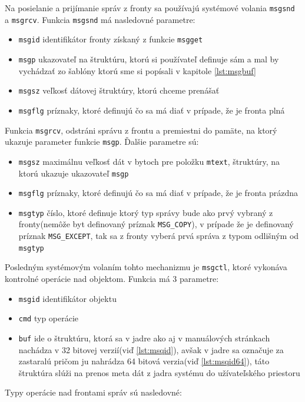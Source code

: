 Na posielanie a prijímanie správ z fronty sa používajú systémové volania \texttt{msgsnd} a \texttt{msgrcv}. Funkcia \texttt{msgsnd} má nasledovné parametre\cite{msgop}:
\begin{itemize}
\item \texttt{msgid} identifikátor fronty získaný z funkcie \texttt{msgget}
\item \texttt{msgp} ukazovateľ na štruktúru, ktorú si používateľ definuje sám a mal by vychádzať zo šablóny ktorú sme si popísali v kapitole \ref{lst:msgbuf}
\item \texttt{msgsz} veľkosť dátovej štruktúry, ktorú chceme prenášať
\item \texttt{msgflg} príznaky, ktoré definujú čo sa má diať v prípade, že je fronta plná
\end{itemize}
Funkcia \texttt{msgrcv}, odstráni správu z frontu a premiestni do pamäte, na ktorý ukazuje parameter funkcie \texttt{msgp}. Ďalšie parametre sú\cite{msgop}:
\begin{itemize}
\item \texttt{msgsz} maximálnu veľkosť dát v bytoch pre položku \texttt{mtext}, štruktúry, na ktorú ukazuje ukazovateľ \texttt{msgp}
\item \texttt{msgflg} príznaky, ktoré definujú čo sa má diať v prípade, že je fronta prázdna
\item \texttt{msgtyp} číslo, ktoré definuje ktorý typ správy bude ako prvý vybraný z fronty(nemôže byt definovaný príznak \texttt{MSG\_COPY}), v prípade že je definovaný príznak \texttt{MSG\_EXCEPT}, tak sa z fronty vyberá prvá správa z typom odlišným od \texttt{msgtyp}
\end{itemize}
Posledným systémovým volaním tohto mechanizmu je \texttt{msgctl}, ktoré vykonáva kontrolné operácie nad objektom. Funkcia má 3 parametre\cite{msgctl}:
\begin{itemize}
\item \texttt{msgid} identifikátor objektu
\item \texttt{cmd} typ operácie
\item \texttt{buf} ide o štruktúru, ktorá sa v jadre ako aj v manuálových stránkach nachádza v 32 bitovej verzií(viď \ref{lst:msqid}), avšak v jadre sa označuje za zastaralú pričom ju nahrádza 64 bitová verzia(viď \ref{lst:msqid64}), táto štruktúra slúži na prenos meta dát z jadra systému do užívateľského priestoru
\end{itemize}
Typy operácie nad frontami správ sú nasledovné\cite{msgctl}:
